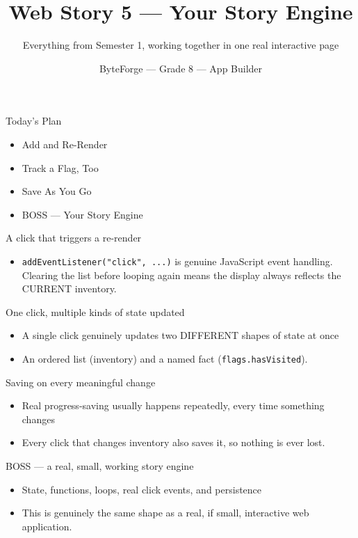 \documentclass[aspectratio=169]{beamer}
\title{Web Story 5 — Your Story Engine}
\subtitle{Everything from Semester 1, working together in one real interactive page}
\author{ByteForge --- Grade 8 --- App Builder}
\date{}
\begin{document}
\begin{frame}
    \titlepage
\end{frame}

\begin{frame}{Today's Plan}
    \begin{itemize}
        \item Add and Re-Render
        \item Track a Flag, Too
        \item Save As You Go
        \item[$\bigstar$] BOSS --- Your Story Engine
    \end{itemize}
\end{frame}

\begin{frame}{A click that triggers a re-render}
    \large
    \begin{itemize}
        \item \texttt{addEventListener("click", ...)} is genuine JavaScript event handling. Clearing the list before looping again means the display always reflects the CURRENT inventory.
    \end{itemize}
\end{frame}


\begin{frame}{One click, multiple kinds of state updated}
    \large
    \begin{itemize}
        \item A single click genuinely updates two DIFFERENT shapes of state at once
        \item An ordered list (inventory) and a named fact (\texttt{flags.hasVisited}).
    \end{itemize}
\end{frame}


\begin{frame}{Saving on every meaningful change}
    \large
    \begin{itemize}
        \item Real progress-saving usually happens repeatedly, every time something changes
        \item Every click that changes inventory also saves it, so nothing is ever lost.
    \end{itemize}
\end{frame}


\begin{frame}{BOSS — a real, small, working story engine}
    \large
    \begin{itemize}
        \item State, functions, loops, real click events, and persistence
        \item This is genuinely the same shape as a real, if small, interactive web application.
    \end{itemize}
\end{frame}
\end{document}
